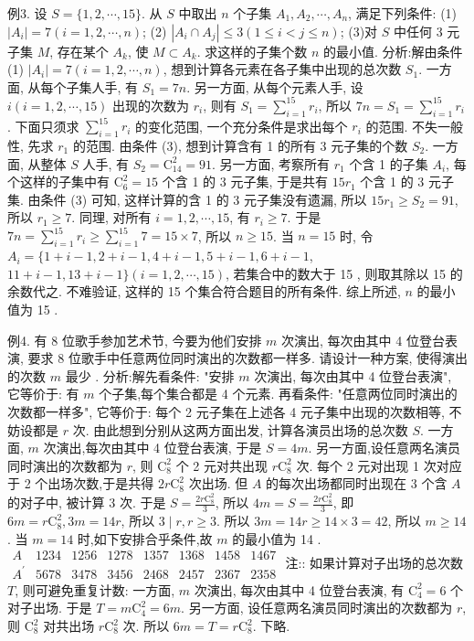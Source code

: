 例3. 设 $S=\{1,2, \cdots, 15\}$. 从 $S$ 中取出 $n$ 个子集 $A_1, A_2, \cdots, A_n$, 满足下列条件:
(1) $\left|A_i\right|=7(i=1,2, \cdots, n)$;
(2) $\left|A_i \cap A_j\right| \leqslant 3(1 \leqslant i<j \leqslant n)$;
(3)对 $S$ 中任何 3 元子集 $M$, 存在某个 $A_k$, 使 $M \subset A_k$.
求这样的子集个数 $n$ 的最小值.
分析:解由条件(1) $\left|A_i\right|=7(i=1,2, \cdots, n)$, 想到计算各元素在各子集中出现的总次数 $S_1$.
一方面, 从每个子集人手, 有 $S_1=7 n$. 另一方面, 从每个元素人手, 设 $i(i=1,2, \cdots, 15)$ 出现的次数为 $r_i$, 则有 $S_1=\sum_{i=1}^{15} r_i$, 所以 $7 n=S_1=\sum_{i=1}^{15} r_i$. 下面只须求 $\sum_{i=1}^{15} r_i$ 的变化范围, 一个充分条件是求出每个 $r_i$ 的范围.
不失一般性, 先求 $r_1$ 的范围.
由条件 (3), 想到计算含有 1 的所有 3 元子集的个数 $S_2$.
一方面, 从整体 $S$ 人手, 有 $S_2=\mathrm{C}_{14}^2=91$. 另一方面, 考察所有 $r_1$ 个含 1 的子集 $A_i$, 每个这样的子集中有 $\mathrm{C}_6^2=15$ 个含 1 的 3 元子集, 于是共有 $15 r_1$ 个含 1 的 3 元子集.
由条件 (3) 可知, 这样计算的含 1 的 3 元子集没有遗漏, 所以 $15 r_1 \geqslant S_2=91$, 所以 $r_1 \geqslant 7$. 同理, 对所有 $i=1,2, \cdots, 15$, 有 $r_i \geqslant 7$. 于是 $7 n=\sum_{i=1}^{15} r_i \geqslant \sum_{i=1}^{15} 7=15 \times 7$, 所以 $n \geqslant 15$.
当 $n=15$ 时, 令 $A_i=\{1+i-1,2+i-1,4+i-1,5+i-1,6+i-1$, $11+i-1,13+i-1\}(i=1,2, \cdots, 15)$, 若集合中的数大于 15 , 则取其除以 15 的余数代之.
不难验证, 这样的 15 个集合符合题目的所有条件.
综上所述, $n$ 的最小值为 15 .



例4. 有 8 位歌手参加艺术节, 今要为他们安排 $m$ 次演出, 每次由其中 4 位登台表演, 要求 8 位歌手中任意两位同时演出的次数都一样多.
请设计一种方案, 使得演出的次数 $m$ 最少 .
分析:解先看条件: "安排 $m$ 次演出, 每次由其中 4 位登台表演", 它等价于: 有 $m$ 个子集,每个集合都是 4 个元素.
再看条件: "任意两位同时演出的次数都一样多", 它等价于: 每个 2 元子集在上述各 4 元子集中出现的次数相等, 不妨设都是 $r$ 次.
由此想到分别从这两方面出发, 计算各演员出场的总次数 $S$.
一方面, $m$ 次演出,每次由其中 4 位登台表演, 于是 $S=4 m$.
另一方面,设任意两名演员同时演出的次数都为 $r$, 则 $\mathrm{C}_8^2$ 个 2 元对共出现 $r \mathrm{C}_8^2$ 次.
每个 2 元对出现 1 次对应于 2 个出场次数,于是共得 $2 r \mathrm{C}_8^2$ 次出场.
但 $A$ 的每次出场都同时出现在 3 个含 $A$ 的对子中, 被计算 3 次.
于是 $S= \frac{2 r \mathrm{C}_8^2}{3}$, 所以 $4 m=S=\frac{2 r \mathrm{C}_8^2}{3}$, 即 $6 m=r \mathrm{C}_8^2, 3 m=14 r$, 所以 $3 \mid r, r \geqslant 3$. 所以 $3 m=14 r \geqslant 14 \times 3=42$, 所以 $m \geqslant 14$.
当 $m=14$ 时,如下安排合乎条件,故 $m$ 的最小值为 14 .
$\begin{array}{llllllll}A & 1234 & 1256 & 1278 & 1357 & 1368 & 1458 & 1467 \\ A^{\prime} & 5678 & 3478 & 3456 & 2468 & 2457 & 2367 & 2358\end{array}$
注:: 如果计算对子出场的总次数 $T$, 则可避免重复计数:
一方面, $m$ 次演出, 每次由其中 4 位登台表演, 有 $\mathrm{C}_4^2=6$ 个对子出场.
于是 $T=m \mathrm{C}_4^2=6 m$. 另一方面, 设任意两名演员同时演出的次数都为 $r$, 则 $\mathrm{C}_8^2$ 对共出场 $r \mathrm{C}_8^2$ 次.
所以 $6 m=T=r \mathrm{C}_8^2$. 下略.



